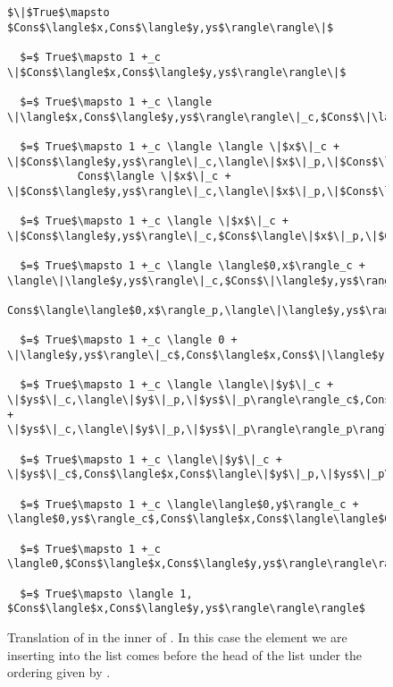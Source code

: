 \begin{figure}[H]
\caption{Translation of  in the inner  of .
In this case the element we are inserting into the list comes before the head of the list under the ordering given by .
}
\label{fig:insert_true}
\begin{lstlisting}
$\|$True$\mapsto $Cons$\langle$x,Cons$\langle$y,ys$\rangle\rangle\|$

  $=$ True$\mapsto 1 +_c \|$Cons$\langle$x,Cons$\langle$y,ys$\rangle\rangle\|$

  $=$ True$\mapsto 1 +_c \langle \|\langle$x,Cons$\langle$y,ys$\rangle\rangle\|_c,$Cons$\|\langle$x,Cons$\langle$y,ys$\rangle\rangle\|_p\rangle$

  $=$ True$\mapsto 1 +_c \langle \langle \|$x$\|_c + \|$Cons$\langle$y,ys$\rangle\|_c,\langle\|$x$\|_p,\|$Cons$\langle$y,ys$\rangle\|_p\rangle\rangle_c$,
           Cons$\langle \|$x$\|_c + \|$Cons$\langle$y,ys$\rangle\|_c,\langle\|$x$\|_p,\|$Cons$\langle$y,ys$\rangle\|_p\rangle\rangle_p\rangle$

  $=$ True$\mapsto 1 +_c \langle \|$x$\|_c + \|$Cons$\langle$y,ys$\rangle\|_c,$Cons$\langle\|$x$\|_p,\|$Cons$\langle$y,ys$\rangle\|_p\rangle\rangle$

  $=$ True$\mapsto 1 +_c \langle \langle$0,x$\rangle_c + \langle\|\langle$y,ys$\rangle\|_c,$Cons$\|\langle$y,ys$\rangle\|_p\rangle_c$,
          Cons$\langle\langle$0,x$\rangle_p,\langle\|\langle$y,ys$\rangle\|_c,$Cons$\|\langle$y,ys$\rangle\|_p\rangle_p\rangle\rangle$

  $=$ True$\mapsto 1 +_c \langle 0 + \|\langle$y,ys$\rangle\|_c$,Cons$\langle$x,Cons$\|\langle$y,ys$\rangle\|_p\rangle\rangle$

  $=$ True$\mapsto 1 +_c \langle \langle\|$y$\|_c + \|$ys$\|_c,\langle\|$y$\|_p,\|$ys$\|_p\rangle\rangle_c$,Cons$\langle$x,Cons$\langle\|$y$\|_c + \|$ys$\|_c,\langle\|$y$\|_p,\|$ys$\|_p\rangle\rangle_p\rangle\rangle$

  $=$ True$\mapsto 1 +_c \langle\|$y$\|_c + \|$ys$\|_c$,Cons$\langle$x,Cons$\langle\|$y$\|_p,\|$ys$\|_p\rangle\rangle\rangle$

  $=$ True$\mapsto 1 +_c \langle\langle$0,y$\rangle_c + \langle$0,ys$\rangle_c$,Cons$\langle$x,Cons$\langle\langle$0,y$\rangle_p,\langle$0,ys$\rangle_p\rangle\rangle\rangle$

  $=$ True$\mapsto 1 +_c \langle0,$Cons$\langle$x,Cons$\langle$y,ys$\rangle\rangle\rangle$

  $=$ True$\mapsto \langle 1, $Cons$\langle$x,Cons$\langle$y,ys$\rangle\rangle\rangle$
\end{lstlisting}
\end{figure}

